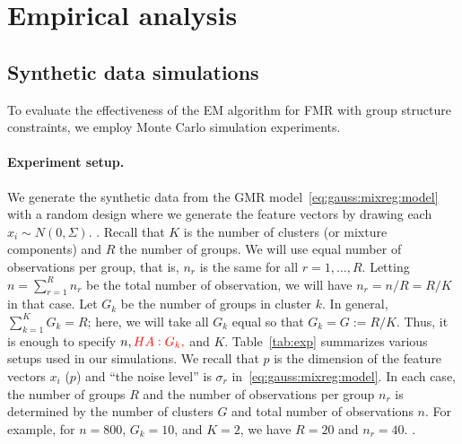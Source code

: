 \documentclass[12pt]{article}
\begin{document}
\section{Empirical analysis}

\subsection{Synthetic data simulations}
To evaluate the effectiveness of the EM algorithm for FMR with group structure constraints, we employ Monte Carlo simulation experiments.
\paragraph{Experiment setup.} We generate the synthetic  data from the GMR model~\eqref{eq:gauss:mixreg:model} with a  random design where we generate the feature vectors by drawing each $x_i \sim N(0,\Sigma)$. .
 Recall that $K$ is the number of clusters (or mixture components) and $R$ the number of groups. We will use equal number of observations per group, that is, $n_r$ is the same for all $r=1,\dots,R$. Letting $n = \sum_{r=1}^R n_r$ be the total number of observation, we will have $n_r = n/R = R/K$ in that case. Let $G_k$ be the number of groups in cluster $k$. In general, $\sum_{k=1}^K G_k = R$; here, we will take all $G_k$ equal so that  $G_k = G := R/K$. Thus, it is enough to specify $n, \ha{G_k,}$ and $K$. Table~\ref{tab:exp} summarizes various setups used in our simulations.
We recall that $p$ is the dimension of the feature vectors $x_i$ ($p$) and ``the noise level'' is  $\sigma_r$ in~\eqref{eq:gauss:mixreg:model}. In each case, the number of groups $R$ and the number of observations per group $n_r$ is determined by the number of clusters $G$ and total number of observations $n$. For example, for $n = 800$, $G_k=10$, and $K=2$, we have $R = 20$ and $n_r = 40$.  .
\end{document}
